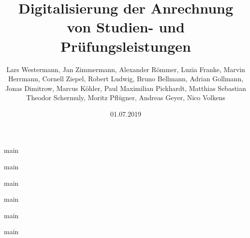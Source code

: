 \documentclass[ngerman]{tudscrreprt}
\begin{document}
\date{01.07.2019}
\author{Lars Westermann, Jan Zimmermann, Alexander Römmer, Luzia Franke, Marvin Herrmann, Cornell Ziepel, Robert Ludwig, Bruno Bellmann, Adrian Gollmann, Jonas Dimitrow, Marcus Köhler, Paul Maximilian Pickhardt, Matthias Sebastian Theodor Schermuly, Moritz Pflügner, Andreas Geyer, Nico Volkens}
\title{Digitalisierung der Anrechnung von Studien- und Prüfungsleistungen}
\maketitle

\tableofcontents

{main}

{main}

{main}

{main}

{main}

{main}

\printbibliography
\end{document}
